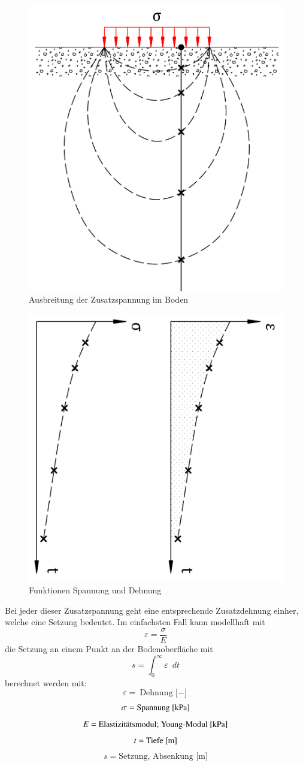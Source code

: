 \begin{figure}
	\centering
	\includegraphics[width=0.5\linewidth,keepaspectratio]{papers/spannung/Grafiken/Bild4.png}
	\caption{Ausbreitung der Zusatzspannung im Boden}
	\label{fig:Bild4}
\end{figure}

\begin{figure}
	\centering
	\includegraphics[width=0.5\linewidth,keepaspectratio]{papers/spannung/Grafiken/Bild5.png}
	\caption{Funktionen Spannung und Dehnung}
	\label{fig:Bild5}
\end{figure}

Bei jeder dieser Zusatzspannung geht eine entsprechende Zusatzdehnung einher, welche eine Setzung bedeutet.
Im einfachsten Fall kann modellhaft mit
\[
\varepsilon
=
\frac{\sigma}{E}
\]
die Setzung an einem Punkt an der Bodenoberfläche mit
\[
s
=
\int_{0}^{\infty}\varepsilon\enspace dt
\]
berechnet werden mit:
\[
\varepsilon
=
\text{Dehnung [$-$]}
\]
\[
\sigma
=
\text{Spannung [\si{\kilo\pascal}]}
\]
\[
E
=
\text{Elastizitätsmodul; Young-Modul [\si{\kilo\pascal}]}
\]
\[
t
=
\text{Tiefe [\si{\meter}]}
\]
\[
s
=
\text{Setzung, Absenkung [m]}
\]

